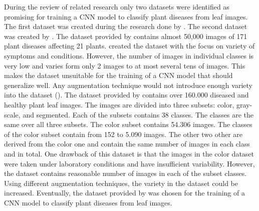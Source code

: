 \documentclass{BachelorBUI}
\begin{document}
    During the review of related research only two datasets were identified as promising for training a CNN model to classify plant diseases from leaf images. The first dataset was created during the research done by \textcite{Mohanty:2016}. The second dataset was created by \textcite{Barbedo:2018:1}. The dataset provided by \textcite{Barbedo:2018:2} contains almost 50,000 images of 171 plant diseases affecting 21 plants. \textcite{Barbedo:2018:2} created the dataset with the focus on variety of symptoms and conditions. However, the number of images in individual classes is very low and varies form only 2 images to at most several tens of images. This makes the dataset unsuitable for the training of a CNN model that should generalize well. Any augmentation technique would not introduce enough variety into the dataset (\cite{Barbedo:2018:2}). The dataset provided by \textcite{Mohanty:2016} contains over 160.000 diseased and healthy plant leaf images. The images are divided into three subsets: color, gray-scale, and segmented. Each of the subsets contains 38 classes. The classes are the same over all three subsets. The color subset contains 54.306 images. The classes of the color subset contain from 152 to 5.090 images. The other two other are derived from the color one and contain the same number of images in each class and in total. One drawback of this dataset is that the images in the color dataset were taken under laboratory conditions and have insufficient variability. However, the dataset contains reasonable number of images in each of the subset classes. Using different augmentation techniques, the variety in the dataset could be increased. Eventually, the dataset provided by \textcite{Mohanty:2016} was chosen for the training of a CNN model to classify plant diseases from leaf images.




\end{document}
